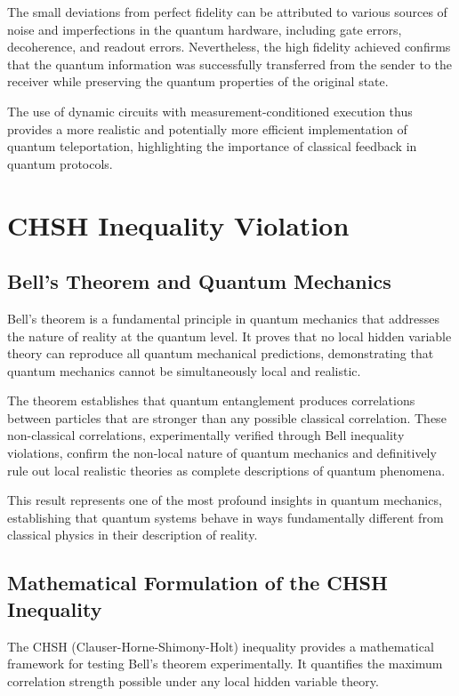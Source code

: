 \documentclass[12pt,a4paper]{article}
\begin{document}
The small deviations from perfect fidelity can be attributed to various sources of noise and imperfections in the quantum hardware, including gate errors, decoherence, and readout errors. Nevertheless, the high fidelity achieved confirms that the quantum information was successfully transferred from the sender to the receiver while preserving the quantum properties of the original state.

The use of dynamic circuits with measurement-conditioned execution thus provides a more realistic and potentially more efficient implementation of quantum teleportation, highlighting the importance of classical feedback in quantum protocols.




\section{CHSH Inequality Violation}


\subsection{Bell's Theorem and Quantum Mechanics}
Bell's theorem is a fundamental principle in quantum mechanics that addresses the nature of reality at the quantum level. It proves that no local hidden variable theory can reproduce all quantum mechanical predictions, demonstrating that quantum mechanics cannot be simultaneously local and realistic.

The theorem establishes that quantum entanglement produces correlations between particles that are stronger than any possible classical correlation. These non-classical correlations, experimentally verified through Bell inequality violations, confirm the non-local nature of quantum mechanics and definitively rule out local realistic theories as complete descriptions of quantum phenomena.

This result represents one of the most profound insights in quantum mechanics, establishing that quantum systems behave in ways fundamentally different from classical physics in their description of reality.

\subsection{Mathematical Formulation of the CHSH Inequality}

The CHSH (Clauser-Horne-Shimony-Holt) inequality provides a mathematical framework for testing Bell's theorem experimentally. It quantifies the maximum correlation strength possible under any local hidden variable theory.
\end{document}
